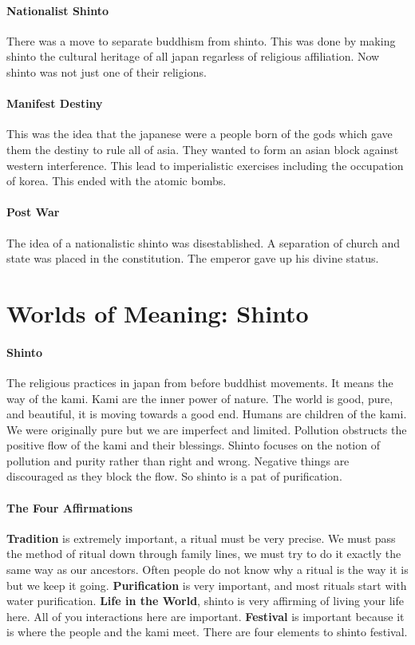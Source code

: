 \documentclass{article}
\begin{document}
\paragraph{Nationalist Shinto}
\label{par:nationalist_shinto}
There was a move to separate buddhism from shinto. This was done by making shinto the cultural heritage of all japan regarless of religious affiliation. Now shinto was not just one of their religions.

\paragraph{Manifest Destiny}
\label{par:manifest_destiny}
This was the idea that the japanese were a people born of the gods which gave them the destiny to rule all of asia. They wanted to form an asian block against western interference. This lead to imperialistic exercises including the occupation of korea. This ended with the atomic bombs.

\paragraph{Post War}
\label{par:p}
The idea of a nationalistic shinto was disestablished. A separation of church and state was placed in the constitution. The emperor gave up his divine status.

\section*{Worlds of Meaning: Shinto}
\label{sec:worlds_of_meaning_shinto}
\paragraph{Shinto}
\label{par:shinto}
The religious practices in japan from before buddhist movements. It means the way of the kami. Kami are the inner power of nature. The world is good, pure, and beautiful, it is moving towards a good end. Humans are children of the kami. We were originally pure but we are imperfect and limited. Pollution obstructs the positive flow of the kami and their blessings. Shinto focuses on the notion of pollution and purity rather than right and wrong. Negative things are discouraged as they block the flow. So shinto is a pat of purification.

\paragraph{The Four Affirmations}
\label{par:the_four_affirmations}
\textbf{Tradition} is extremely important, a ritual must be very precise. We must pass the method of ritual down through family lines, we must try to do it exactly the same way as our ancestors. Often people do not know why a ritual is the way it is but we keep it going. \textbf{Purification} is very important, and most rituals start with water purification. \textbf{Life in the World}, shinto is very affirming of living your life here. All of you interactions here are important. \textbf{Festival} is important because it is where the people and the kami meet. There are four elements to shinto festival.
\end{document}
